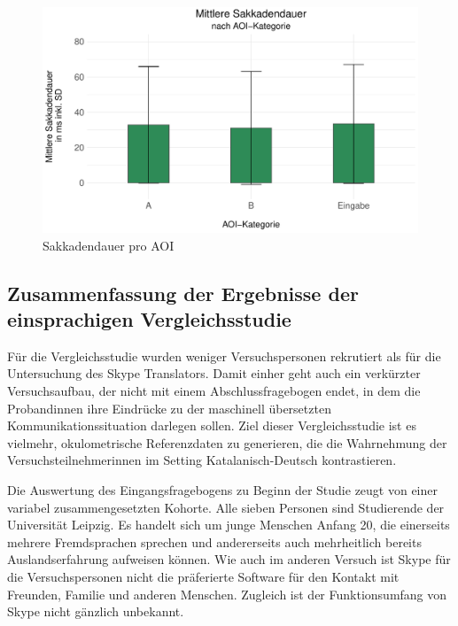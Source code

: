 \begin{figure}
	\includegraphics[width=.85\textwidth]{Figures/EyeTracking/DD/ggplot_DD-boxplot_sacdur_AOI_de}
	\caption{Sakkadendauer pro AOI}
	\label{K6:fig:DeDe:sacdur-mean}
\end{figure}




\subsection{Zusammenfassung der Ergebnisse der einsprachigen Vergleichsstudie}
\label{K6:subsec:resumee:DeDe}\largerpage


Für die Vergleichsstudie wurden weniger Versuchspersonen rekrutiert als für die Untersuchung des Skype Translators. Damit einher geht auch ein verkürzter Versuchsaufbau, der nicht mit einem Abschlussfragebogen endet, in dem die Proband{\textperiodcentered}innen ihre Eindrücke zu der maschinell übersetzten Kommunikationssituation darlegen sollen. Ziel dieser Vergleichsstudie ist es vielmehr, okulometrische Referenzdaten zu generieren, die die Wahrnehmung der Versuchsteilnehmer{\textperiodcentered}innen im Setting Katalanisch-Deutsch kontrastieren.

Die Auswertung des Eingangsfragebogens zu Beginn der Studie zeugt von einer variabel zusammengesetzten Kohorte. Alle sieben Personen sind Studierende der Universität Leipzig. Es handelt sich um junge Menschen Anfang 20, die einerseits mehrere Fremdsprachen sprechen und andererseits auch mehrheitlich bereits Auslandserfahrung aufweisen können. Wie auch im anderen Versuch ist Skype für die Versuchspersonen nicht die präferierte Software für den Kontakt mit Freunden, Familie und anderen Menschen. Zugleich ist der Funktionsumfang von Skype nicht gänzlich unbekannt.

